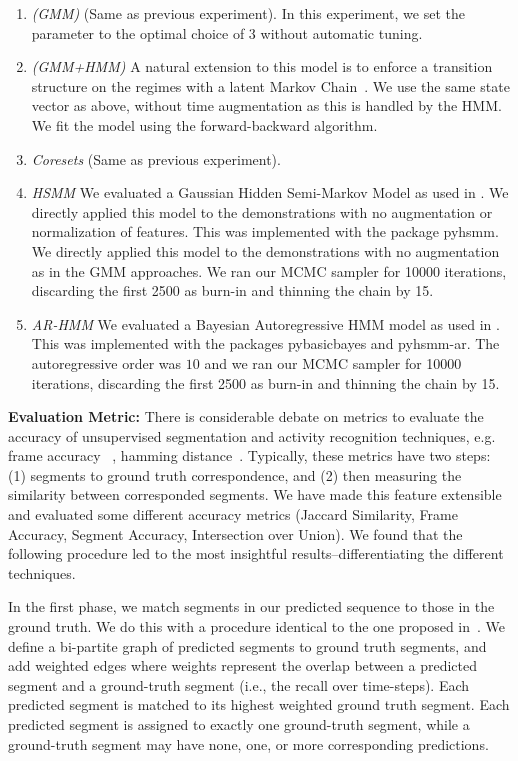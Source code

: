 \begin{enumerate}
    \item \emph{(GMM)} (Same as previous experiment). In this experiment, we set the parameter to the optimal choice of $3$ without automatic tuning.
    \item \emph{(GMM+HMM)} A natural extension to this model is to enforce a transition structure on the regimes with a latent Markov Chain~\citep{asfour2006imitation,calinon2004stochastic,kruger2010learning, vakanski2012trajectory}. 
    We use the same state vector as above, without time augmentation as this is handled by the HMM. We fit the model using the forward-backward algorithm.
    \item \emph{Coresets} (Same as previous experiment).
    \item \emph{HSMM} We evaluated a Gaussian Hidden Semi-Markov Model as used in \cite{tanwani2016learning}. We directly applied this model to the demonstrations with no augmentation or normalization of features. This was implemented with the package \textsf{pyhsmm}. We directly applied this model to the demonstrations with no augmentation as in the GMM approaches. We ran our MCMC sampler for 10000 iterations, discarding the first 2500 as burn-in and thinning the chain by 15. 
    \item \emph{AR-HMM} We evaluated a Bayesian Autoregressive HMM model as used in \cite{niekum2012learning}. This was implemented with the packages \textsf{pybasicbayes} and \textsf{pyhsmm-ar}. The autoregressive order was $10$ and we ran our MCMC sampler for 10000 iterations, discarding the first 2500 as burn-in and thinning the chain by 15. 
\end{enumerate}

\vspace{0.5em}
\noindent\textbf{Evaluation Metric: } There is considerable debate on metrics to evaluate the accuracy of unsupervised segmentation and activity recognition techniques, e.g. frame accuracy ~\citep{wu2015watch}, hamming distance~\citep{fox2009sharing}. Typically, these metrics have two steps: (1) segments to ground truth correspondence, and (2) then measuring the similarity between corresponded segments. We have made this feature extensible and evaluated some different accuracy metrics (Jaccard Similarity, Frame Accuracy, Segment Accuracy, Intersection over Union). We found that the following procedure led to the most insightful results--differentiating the different techniques.

In the first phase, we match segments in our predicted sequence to those in the ground truth. We do this with a procedure identical to the one proposed in~\cite{wu2015watch}. We define a bi-partite graph of predicted segments to ground truth segments, and add weighted edges where weights represent the overlap between a predicted segment and a ground-truth segment (i.e., the recall over time-steps). Each predicted segment is matched to its highest weighted ground truth segment. Each predicted segment is assigned to exactly one ground-truth segment, while a ground-truth segment may have none, one, or more corresponding predictions.

